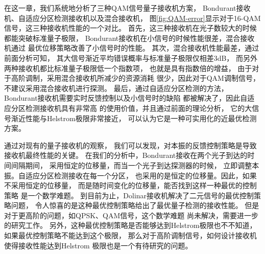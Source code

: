 在这一章，我们系统地分析了三种QAM信号量子接收机方案，
Bondurant接收机、自适应分区检测接收机以及混合接收机，
图\ref{fig:QAM-error}显示对于16-QAM信号，这三种接收机性能的一个对比。
首先，这三种接收机在光子数较大的时候都能突破标准量子极限，
Bondurant接收机在小信号的时候性能很差，混合接收机通过
最优位移策略改善了小信号时的性能。
其次，混合接收机性能最差，通过前面分析可知，
其大信号渐近平均错误概率与标准量子极限仅相差3dB，
而另外两种接收机都比标准量子极限低一个指数项，
也就是具有指数倍的增益，
由于对于高阶调制，采用混合接收机所减少的资源消耗
很少，因此对于QAM调制信号，不建议采用混合接收机进行探测。
最后，通过自适应分区检测的方法，
Bondurant接收机需要实时反馈控制以及小信号时的缺陷
都被解决了，因此自适应分区检测接收机具有非常高
的使用价值，并且通过前面的理论分析，
它的大信号渐近性能与Helstrom极限非常接近，
可以认为它是一种可实用化的近最优检测方案。





通过对现有的量子接收机的观察，
我们可以发现，对本振的反馈控制策略是导致接收机最终性能的关键。
在我们的分析中，Bondurant接收在两个光子到达的时间间隔期间，
采用恒定的位移量，而当一个光子到达探测器的时候，
立即调整本振。自适应分区检测接收在每一个分区，
也采用的是恒定的位移量。因此，如果不采用恒定的位移量，
而是随时间变化的位移量，能否找到这样一种最优的控制策略
是一个数学难题。
到目前为止，Dolinar接收机解决了二元信号的最优控制策略问题，
令人惊喜的是这种最优控制策略给出了最优量子检测的接收性能。
但是对于更高阶的问题，如QPSK、QAM信号，这个数学难题
尚未解决，需要进一步的研究工作。
另外，这种最优控制策略是否能够达到Helstrom极限也不不知道，
如果最优控制策略不能达到这个极限，
那么对于高阶调制信号，如何设计接收机使得接收性能达到Helstrom
极限也是一个有待研究的问题。

